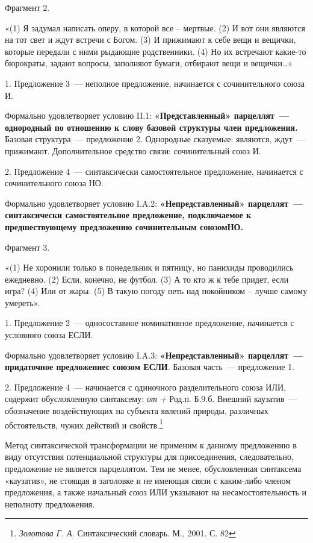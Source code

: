 \documentclass{kursa4}
\begin{document}
      {Фрагмент 2. }

      {«(1) Я задумал написать оперу, в которой все – мертвые. (2) И вот они являются на тот свет и ждут встречи с Богом. (3) И прижимают к себе вещи и вещички, которые передали с ними рыдающие родственники. (4) Но их встречают какие-то бюрократы, задают вопросы, заполняют бумаги, отбирают вещи и вещички…»}

      {1. Предложение 3~--- неполное предложение, начинается с сочинительного союза И.}

      {Формально удовлетворяет условию II.1:
      }\textbf{{«Представленный» парцеллят~--- однородный по отношению к слову базовой структуры член предложения.
      }}{Базовая структура~--- предложение 2. Однородные сказуемые: являются, ждут~--- прижимают. Дополнительное средство связи: сочинительный союз И.}

      {2. Предложение 4~--- синтаксически самостоятельное предложение, начинается с сочинительного союза НО.}



      Формально удовлетворяет условию I.A.2: \textbf{«Непредставленный» парцеллят~--- синтаксически самостоятельное предложение, подключаемое к предшествующему предложению сочинительным союзомНО.}

      {Фрагмент 3.}

      {«(1) Не хоронили только в понедельник и пятницу, но панихиды проводились ежедневно. (2) Если, конечно, не футбол. (3) А то кто ж к тебе придет, если игра? (4) Или от жары. (5)
      }{В такую погоду петь над покойником – лучше самому умереть».}

      {1. Предложение 2~--- односоставное номинативное предложение, начинается с условного союза ЕСЛИ.}

      Формально удовлетворяет условию I.A.3: \textbf{«Непредставленный» парцеллят~--- придаточное предложениес союзом ЕСЛИ}. Базовая часть~--- предложение 1.

      {2. Предложение 4~--- начинается с одиночного разделительного союза ИЛИ, содержит обусловленную синтаксему:
      }\textit{{от + }}{Род.п. Б.9.б. Внешний каузатив~--- обозначение воздействующих на субъекта явлений природы, различных обстоятельств, чужих действий и свойств.}\footnote{\textit{ Золотова Г. А.} Синтаксический словарь. М., 2001. С. 82}

      Метод синтаксической трансформации не применим к данному предложению в виду отсутствия потенциальной структуры для присоединения, следовательно, предложение не является парцеллятом. Тем не менее, обусловленная синтаксема «каузатив», не стоящая в заголовке и не имеющая связи с каким-либо членом предложения, а также начальный союз ИЛИ указывают на несамостоятельность и неполноту предложения. 
\end{document}
